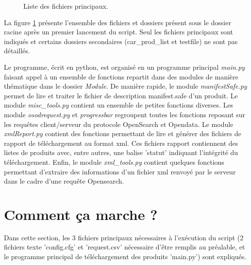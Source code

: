 \documentclass[notitlepage]{report}
\begin{document}
\begin{figure}
\caption{Liste des fichiers principaux.}
\label{fig:treeMain}
\end{figure}
La figure \ref{fig:treeMain} présente l'ensemble des fichiers et dossiers présent sous le dossier racine après un premier lancement du script. Seul les fichiers principaux sont indiqués et certains dossiers secondaires (car\_prod\_list et testfile) ne sont pas détaillés.

Le programme, écrit en python, est organisé en un programme principal \emph{main.py} faisant appel à un ensemble de fonctions repartit dans des modules de manière thématique dans le dossier \emph{Module}. De manière rapide, le module \emph{manifestSafe.py} permet de lire et traiter le fichier de description manifest.safe d'un produit. Le module \emph{misc\_tools.py} contient un ensemble de petites fonctions diverses. Les module \emph{osodrequest.py} et \emph{progressbar} regroupent toutes les fonctions reposant sur les requêtes client/serveur du protocole OpenSearch et Opendata. Le module \emph{xmlReport.py} contient des fonctions permettant de lire et générer des fichiers de rapport de téléchargement au format xml. Ces fichiers rapport contiennent des listes de produits avec, entre autres, une balise 'statut' indiquant l'intégrité du téléchargement. Enfin, le module \emph{xml\_tools.py} contient quelques fonctions permettant d'extraire des informations d'un fichier xml renvoyé par le serveur dans le cadre d'une requête Opensearch.


\section{Comment ça marche ?}
Dans cette section, les 3 fichiers principaux nécessaires à l'exécution du script (2 fichiers texte 'config.cfg' et 'request.csv' nécessaire d'être remplis au préalable, et le programme principal de téléchargement des produits 'main.py') sont expliqués.
\end{document}
